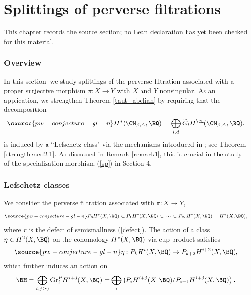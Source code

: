 \chapter{Splittings of perverse filtrations}
\label{pw-conjecture-gl-n-chapter-06}

\begin{remark}
\label{pw-conjecture-gl-n-chapter-06-source}
This chapter records the source section; no Lean declaration has yet been checked for this material.
\notready
\end{remark}

\subsection{Overview}
In this section, we study splittings of the perverse filtration associated with a proper surjective morphism $\pi: X\to Y$ with $X$ and $Y$ nonsingular. As an application, we strengthen Theorem \ref{taut_abelian} by requiring that the decomposition
\begin{equation}\label{decomp6}
\source{pw-conjecture-gl-n}
H^\ast(\CM_{\beta, A}, \BQ) = \bigoplus_{i,d} \widetilde{G}_iH^\CL(\CM_{\beta, A}, \BQ).
\end{equation}
is induced by a ``Lefschetz class" via the mechanisms introduced in \cite{D,dC,dCM4}; see Theorem \ref{strengthened2.1}. As discussed in Remark \ref{remark1}, this is crucial in the study of the specialization morphism (\ref{sp}) in Section 4.

\subsection{Lefschetz classes}
We consider the perverse filtration associated with $\pi: X \to Y$,
\begin{equation}\label{e50}
\source{pw-conjecture-gl-n}
P_0H^\ast(X, \BQ) \subset P_1H^\ast(X, \BQ) \subset \dots \subset P_{2r}H^\ast(X, \BQ) =  H^\ast(X, \BQ),
\end{equation}
where $r$ is the defect of semismallness (\ref{defect}). The action of a class $\eta \in H^2(X, \BQ)$ on the cohomology $H^*(X, \BQ)$ via cup product satisfies
\begin{equation}\label{e51}
\source{pw-conjecture-gl-n}
\eta: P_kH^i(X, \BQ) \to P_{k+2}H^{i+2}(X, \BQ),
\end{equation}
which further induces an action on
\[
\BH = \bigoplus_{i,j\geq 0} \mathrm{Gr}_i^P H^{i+j}(X, \BQ)= \bigoplus_i \left( P_iH^{i+j}(X, \BQ)/P_{i-1}H^{i+j}(X, \BQ) \right).
\]

